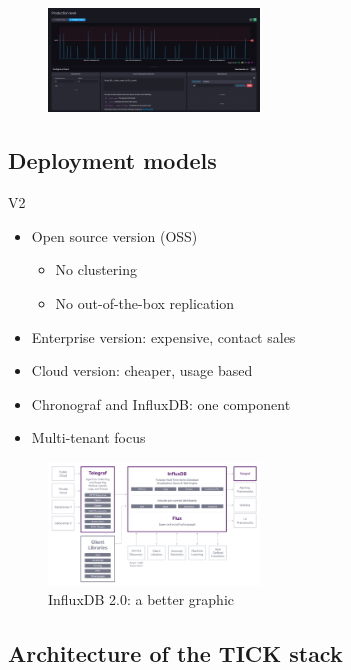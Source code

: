 \documentclass{article}
\begin{document}
\begin{figure}[H]
    \centering
    \includegraphics[width=0.5\textwidth]{kapacitor.png}
    \caption{}
\end{figure}

\subsection{Deployment models}

V2

\begin{itemize}
    \item Open source version (OSS)
    \begin{itemize}
        \item No clustering
        \item No out-of-the-box replication
    \end{itemize}
    \item Enterprise version: expensive, contact sales
    \item Cloud version: cheaper, usage based
    \item Chronograf and InfluxDB: one component
    \item Multi-tenant focus
\end{itemize}

\begin{figure}[H]
    \centering
    \includegraphics[width=0.5\textwidth]{influxdb-2.png}
    \caption{InfluxDB 2.0: a better graphic}
\end{figure}

\subsection{Architecture of the TICK stack}
\end{document}
